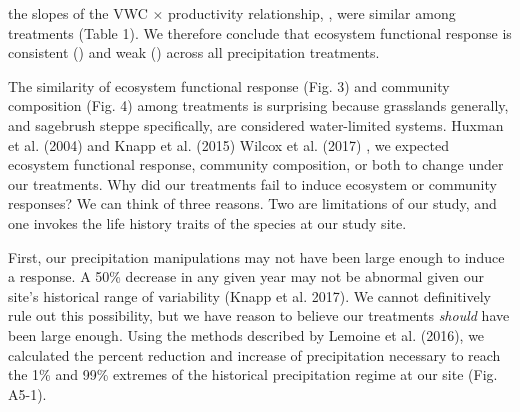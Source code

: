 \documentclass[fleqn,10pt,lineno]{wlpeerj} %
\begin{document}
the slopes of the VWC \(\times\) productivity relationship,
, were similar among treatments (Table 1). We
therefore conclude that ecosystem functional response is consistent
() and weak ()
across all precipitation treatments.

The similarity of ecosystem functional response (Fig. 3) and community
composition (Fig. 4) among treatments is surprising because grasslands
generally, and sagebrush steppe specifically, are considered
water-limited systems.  Huxman et al. (2004) and Knapp
et al. (2015)
Wilcox et al. (2017)
, we expected ecosystem functional
response, community composition, or both to change under our treatments.
Why did our treatments fail to induce ecosystem or community responses?
We can think of three reasons. Two are limitations of our study, and one
invokes the life history traits of the species at our study site.

First, our precipitation manipulations may not have been large enough to
induce a response. A 50\% decrease in any given year may not be abnormal
given our site's historical range of variability (Knapp et al. 2017). We
cannot definitively rule out this possibility, but we have reason to
believe our treatments \emph{should} have been large enough. Using the
methods described by Lemoine et al. (2016), we calculated the percent
reduction and increase of  precipitation necessary to
reach the 1\% and 99\% extremes of the historical precipitation regime
at our site (Fig. A5-1).
\end{document}
